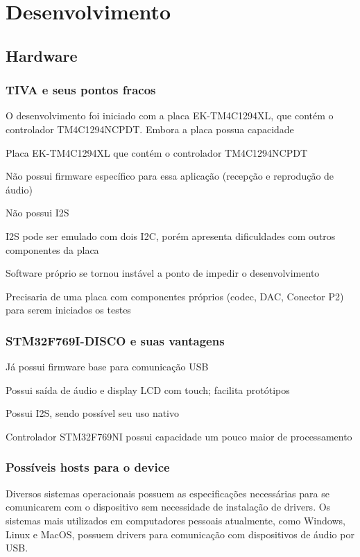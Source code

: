 \chapter{Desenvolvimento}
\section{Hardware}
\subsection{TIVA e seus pontos fracos}
O desenvolvimento foi iniciado com a placa EK-TM4C1294XL, que contém o controlador TM4C1294NCPDT. 
Embora a placa possua capacidade 

\color{orange}
Placa EK-TM4C1294XL que contém o controlador TM4C1294NCPDT

Não possui firmware específico para essa aplicação (recepção e reprodução de áudio)

Não possui I2S

I2S pode ser emulado com dois I2C, porém apresenta dificuldades com outros componentes da placa

Software próprio se tornou instável a ponto de impedir o desenvolvimento

Precisaria de uma placa com componentes próprios (codec, DAC, Conector P2) para serem iniciados os testes
\subsection{STM32F769I-DISCO e suas vantagens}

Já possui firmware base para comunicação USB

Possui saída de áudio e display LCD com touch; facilita protótipos

Possui I2S, sendo possível seu uso nativo

Controlador STM32F769NI possui capacidade um pouco maior de processamento 
\color{black}

\subsection{Possíveis hosts para o device}

Diversos sistemas operacionais possuem as especificações necessárias para se comunicarem com o dispositivo sem necessidade de instalação de drivers. Os sistemas mais utilizados em computadores pessoais atualmente, como Windows, Linux e MacOS, possuem drivers para comunicação com dispositivos de áudio por USB.

